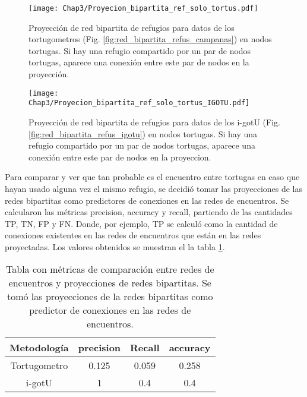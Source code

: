  
\begin{figure}[ht]
    \begin{center}
        \texttt{[image: Chap3/Proyecion\_bipartita\_ref\_solo\_tortus.pdf]}
        \caption[Proyección  de red bipartita de refugios para datos de los tortugometros en nodos tortugas.]{Proyección  de red bipartita de refugios para datos de los tortugometros (Fig. \ref{fig:red_bipartita_refus_campanas}) en nodos tortugas. Si hay una refugio compartido por un par de nodos tortugas, aparece una conexión entre este par de nodos en la proyección. }
        \label{fig:proyeccion_red_campanas}
       
        \end{center}
\end{figure}
 
\begin{figure}[ht]
    \begin{center}
        \texttt{[image: Chap3/Proyecion\_bipartita\_ref\_solo\_tortus\_IGOTU.pdf]}
        \caption[Proyección  de red bipartita de refugios para datos de los tortugometros en nodos tortugas.]{Proyección  de red bipartita de refugios para datos de los i-gotU (Fig. \ref{fig:red_bipartita_refus_igotu}) en nodos tortugas. Si hay una refugio compartido por un par de nodos tortugas, aparece una conexión entre este par de nodos en la proyeccion. }
        \label{fig:proyeccion_red_igotu}
       
        \end{center}
\end{figure}
Para comparar y ver que tan probable es el encuentro entre tortugas en caso que hayan usado alguna vez el mismo refugio, se decidió tomar las proyecciones de las redes bipartitas como predictores de conexiones en las redes de encuentros. Se calcularon las métricas precision, accuracy y recall, partiendo de las cantidades TP, TN, FP y FN. Donde, por ejemplo, TP se calculó como la cantidad de conexiones existentes en las redes de encuentros que están en las redes proyectadas. Los valores obtenidos se muestran el la tabla \ref{tab:metricas_comparacion_redes}.
\begin{table}[ht]
    \centering
    \begin{tabular}{|c|c|c|c|}
       
   \hline
    Metodología  & precision & Recall & accuracy \\ \hline
    Tortugometro & 0.125     & 0.059  & 0.258    \\ \hline
    i-gotU       & 1         & 0.4    & 0.4       \\ \hline
   
    \end{tabular}
    \caption[Tabla con métricas de comparación entre redes de encuentros y proyecciones de redes bipartitas.]{Tabla con métricas de comparación entre redes de encuentros y proyecciones de redes bipartitas. Se tomó las proyecciones de la redes bipartitas como predictor de conexiones en las redes de encuentros.}
    \label{tab:metricas_comparacion_redes}
\end{table}
